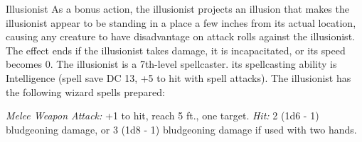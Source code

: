 \documentclass[10pt,a4paper,twoside,twocolumn,openany,bg=print,nodeprecatedcode]{dndbook}
\begin{document}
\begin{DndMonster}[float*=t]{Illusionist}
\DndMonsterBasics[
armor-class = {12 (15 with mage armor)},
hit-points = {\DndDice{7d8 + 7}},
speed = {30 ft.}
]
\DndMonsterAbilityScores[
 str = 9,
 dex = 14,
 con = 13,
 int = 16,
 wis = 11,
 cha = 12
]
\DndMonsterDetails[
saving-throws = {Int +5, Wis +2},
skills = {Arcana +5, History +5},
languages = {any four languages},
challenge = 3,
]
As a bonus action, the illusionist projects an illusion that makes the illusionist appear to be standing in a place a few inches from its actual location, causing any creature to have disadvantage on attack rolls against the illusionist. The effect ends if the illusionist takes damage, it is incapacitated, or its speed becomes 0.
The illusionist is a 7th-level spellcaster. its spellcasting ability is Intelligence (spell save DC 13, +5 to hit with spell attacks). The illusionist has the following wizard spells prepared:
\begin{DndMonsterSpells}
\end{DndMonsterSpells}
\par
{}
\textsl{Melee Weapon Attack:} +1 to hit, reach 5 ft., one target. \textsl{Hit:} 2 (1d6 - 1) bludgeoning damage, or 3 (1d8 - 1) bludgeoning damage if used with two hands.
\end{DndMonster}
\end{document}
